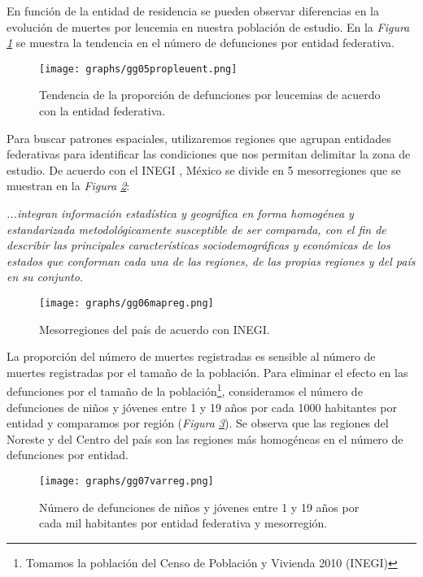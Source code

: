 \documentclass[11pt, oneside]{book}
\begin{document}
En función de la entidad de residencia se pueden observar diferencias en la evolución de muertes por leucemia en nuestra población de estudio. En la \emph{Figura \ref{fig5.ent}} se muestra la tendencia en el número de defunciones por entidad federativa.

\begin{figure}[ht]
    \centering
    \texttt{[image: graphs/gg05propleuent.png]}
  \caption{Tendencia de la proporción de defunciones por leucemias de acuerdo con la entidad federativa.}
  \label{fig5.ent}
\end{figure}

\bigskip 

Para buscar patrones espaciales, utilizaremos regiones que agrupan entidades federativas para identificar las condiciones que nos permitan delimitar la zona de estudio. De acuerdo con el INEGI \cite{INEGI12}, México se divide en 5 mesorregiones que se muestran en la \emph{Figura \ref{fig.6.reg}}:

\begin{center}
	\emph{...integran información estadística y geográfica en forma homogénea y estandarizada metodológicamente susceptible de ser comparada, con el fin de describir las principales características sociodemográficas y económicas de los estados que conforman cada una de las regiones, de las propias regiones y del país en su conjunto.}
\end{center}

\begin{figure}[ht]
    \centering    
    \texttt{[image: graphs/gg06mapreg.png]}
  \caption{Mesorregiones del país de acuerdo con INEGI.}
  \label{fig.6.reg}
\end{figure}

La proporción del número de muertes registradas es sensible al número de muertes registradas por el tamaño de la población. Para eliminar el efecto en las defunciones por el tamaño de la población\footnote{Tomamos la población del Censo de Población y Vivienda 2010 (INEGI)}, consideramos el número de defunciones de niños y jóvenes entre 1 y 19 años por cada 1000 habitantes por entidad y comparamos por región (\emph{Figura \ref{fig7.ent}}). Se observa que las regiones del Noreste y del Centro del país son las regiones más homogéneas en el número de defunciones por entidad.\\

\begin{figure}[ht]
    \centering    
    \texttt{[image: graphs/gg07varreg.png]}
  \caption{Número de defunciones de niños y jóvenes entre 1 y 19 años por cada mil habitantes por entidad federativa y mesorregión.}
  \label{fig7.ent}
\end{figure}
\end{document}
